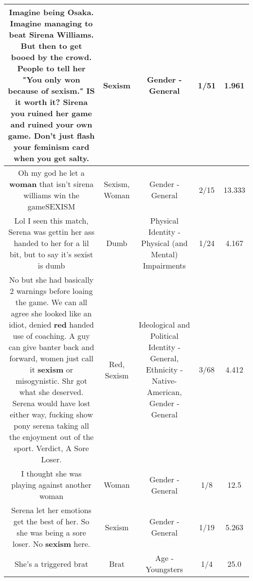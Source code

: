 \documentclass[11pt]{article}
\newlength\mylength
\begin{document}
\begin{center}
\begin{longtable}{|C{.65\mylength}|C{.30\mylength}|C{.12\mylength}|C{.12\mylength}|C{.12\mylength}|}
  \small Imagine being Osaka. Imagine managing to beat Sirena Williams. But then to get booed by the crowd. People to tell her "You only won because of \textbf{sexism}." IS it worth it? Sirena you ruined her game and ruined your own game. Don't just flash your feminism card when you get salty.\normalsize   & Sexism & Gender - General & 1/51 & 1.961 \\  \hline
  \small Oh my god he let a \textbf{woman} that isn't sirena williams win the gameSEXISM\normalsize   & Sexism, Woman & Gender - General & 2/15 & 13.333 \\  \hline
  \small Lol I seen this match, Serena was gettin her ass handed to her for a lil bit, but to say it's sexist is dumb\normalsize   & Dumb & Physical Identity - Physical (and Mental) Impairments & 1/24 & 4.167 \\  \hline
  \small No but she had basically 2 warnings before loaing the game. We can all agree she looked like an idiot, denied \textbf{r\textbf{ed}} handed use of coaching. A guy can give banter back and forward, women just call it \textbf{sexism} or misogynistic. Shr got what she deserved. Serena would have lost either way, fucking show pony serena taking all the enjoyment out of the sport. Verdict, A Sore Loser.\normalsize   & Red, Sexism &  Ideological and Political Identity - General, Ethnicity - Native-American, Gender - General & 3/68 & 4.412 \\  \hline
  \small I thought she was playing against another woman\normalsize   & Woman & Gender - General & 1/8 & 12.5 \\  \hline
  \small Serena let her emotions get the best of her. So she was being a sore loser. No \textbf{sexism} here.\normalsize   & Sexism & Gender - General & 1/19 & 5.263 \\  \hline
  \small She's a triggered brat\normalsize   & Brat & Age - Youngsters & 1/4 & 25.0 \\  \hline

\end{longtable}
\end{center}
\end{document}
